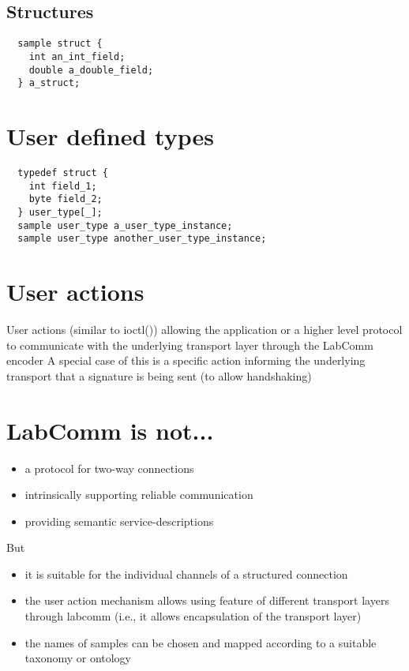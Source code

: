 \documentclass[a4paper]{article}
\begin{document}
\subsection{Structures}

\begin{verbatim}
  sample struct {
    int an_int_field;
    double a_double_field;
  } a_struct;
\end{verbatim}

\section{User defined types}

\begin{verbatim}
  typedef struct {
    int field_1;
    byte field_2;
  } user_type[_];
  sample user_type a_user_type_instance;
  sample user_type another_user_type_instance;
\end{verbatim}

\section{User actions}

User actions (similar to ioctl()) allowing the application or a higher level
protocol to communicate with the underlying transport layer through the LabComm
encoder A special case of this is a specific action informing the underlying
transport that a signature is being sent (to allow handshaking)


\section{LabComm is not...}

\begin{itemize}
\item a protocol for two-way connections
\item intrinsically supporting reliable communication 
\item providing semantic service-descriptions
\end{itemize}

But

\begin{itemize}
\item it is suitable for the individual channels of a structured connection
\item the user action mechanism allows using feature of different transport layers
  through labcomm (i.e., it allows encapsulation of the transport layer)
\item the names of samples can be chosen and mapped according to a suitable taxonomy or ontology
\end{itemize}
\end{document}
